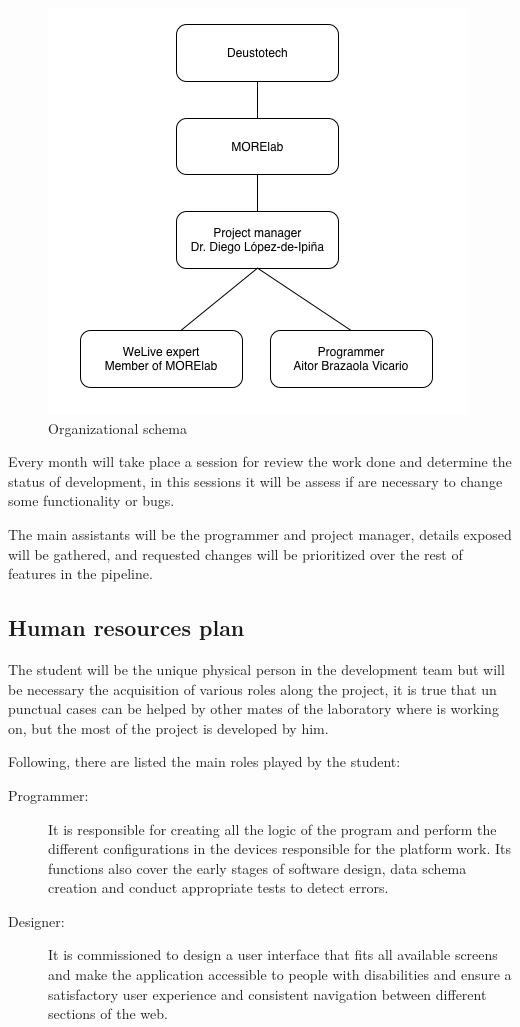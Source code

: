 \documentclass{DeustoFDP}
\begin{document}
\begin{figure}[h]
	\centering
	\includegraphics[width=0.7\linewidth]{fig/esquemaorganizacion}
	\caption[Organizational schema]{Organizational schema}
	\label{fig:esquemaorganizacion}
\end{figure}

Every month will take place a session for review the work done and determine the status of development, in this sessions it will be assess if are necessary to change some functionality or bugs.

The main assistants will be the programmer and project manager, details exposed will be gathered, and requested changes will be prioritized over the rest of features in the pipeline.

\subsection{Human resources plan}
The student will be the unique physical person in the development team but will be necessary the acquisition of various roles along the project, it is true that un punctual cases can be helped by other mates of the laboratory where is working on, but the most of the project is developed by him.

Following, there are listed the main roles played by the student:

\begin{description}
	\item[Programmer:] It is responsible for creating all the logic of the program and perform the different configurations in the devices responsible for the platform work. Its functions also cover the early stages of software design, data schema creation and conduct appropriate tests to detect errors.
	
	\item[Designer:] It is commissioned to design a user interface that fits all available screens and make the application accessible to people with disabilities and ensure a satisfactory user experience and consistent navigation between different sections of the web.
\end{description}
\end{document}
